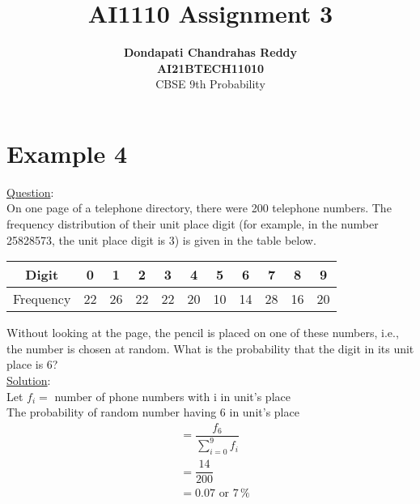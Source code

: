 \documentclass[journal,12pt,twocolumn]{IEEEtran}
\begin{document}
\title{\textbf{AI1110 Assignment 3} }
\author{\textbf{Dondapati Chandrahas Reddy}\\\textbf{AI21BTECH11010}\\ CBSE 9th Probability}
\maketitle

{\section{Example 4}}

{\large \underline{Question}:}\\

On one page of a telephone directory, there were 200 telephone numbers.
The frequency distribution of their unit place digit (for example, in the number 25828573,
the unit place digit is 3) is given in the table below.

\begin{table}[h!]
	\begin{tabular}{|c|c|c|c|c|c|c|c|c|c|c|}
		\hline
		Digit & 0 & 1 & 2 & 3 & 4 & 5 & 6 & 7 & 8 & 9 \\
		\hline
		Frequency & 22 & 26 & 22 & 22 & 20 & 10 & 14 & 28 & 16 & 20 \\
		\hline
	\end{tabular}
\end{table}

Without looking at the page, the pencil is placed on one of these numbers, i.e., the
number is chosen at random. What is the probability that the digit in its unit place is 6? \\

{\large \underline{Solution}:}\\

Let $f_i = $ number of phone numbers with i in unit's place \\

The probability of random number having 6 in unit's place
\begin{align}
	& = \dfrac{f_6}{\sum\limits_{i=0}^{9} f_i}  \\
	& = \dfrac{14}{200} \\
	& = 0.07 \text{ or } 7\,\% 	
\end{align} 
\end{document}
